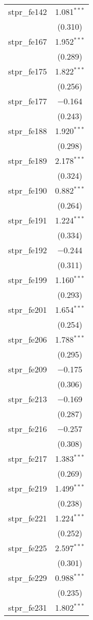 \begin{table}[!htbp]
\begin{tabular}{@{\extracolsep{5pt}}lc}
  stpr\_fe142 & 1.081$^{***}$ \\ 
  & (0.310) \\ 
  stpr\_fe167 & 1.952$^{***}$ \\ 
  & (0.289) \\ 
  stpr\_fe175 & 1.822$^{***}$ \\ 
  & (0.256) \\ 
  stpr\_fe177 & $-$0.164 \\ 
  & (0.243) \\ 
  stpr\_fe188 & 1.920$^{***}$ \\ 
  & (0.298) \\ 
  stpr\_fe189 & 2.178$^{***}$ \\ 
  & (0.324) \\ 
  stpr\_fe190 & 0.882$^{***}$ \\ 
  & (0.264) \\ 
  stpr\_fe191 & 1.224$^{***}$ \\ 
  & (0.334) \\ 
  stpr\_fe192 & $-$0.244 \\ 
  & (0.311) \\ 
  stpr\_fe199 & 1.160$^{***}$ \\ 
  & (0.293) \\ 
  stpr\_fe201 & 1.654$^{***}$ \\ 
  & (0.254) \\ 
  stpr\_fe206 & 1.788$^{***}$ \\ 
  & (0.295) \\ 
  stpr\_fe209 & $-$0.175 \\ 
  & (0.306) \\ 
  stpr\_fe213 & $-$0.169 \\ 
  & (0.287) \\ 
  stpr\_fe216 & $-$0.257 \\ 
  & (0.308) \\ 
  stpr\_fe217 & 1.383$^{***}$ \\ 
  & (0.269) \\ 
  stpr\_fe219 & 1.499$^{***}$ \\ 
  & (0.238) \\ 
  stpr\_fe221 & 1.224$^{***}$ \\ 
  & (0.252) \\ 
  stpr\_fe225 & 2.597$^{***}$ \\ 
  & (0.301) \\ 
  stpr\_fe229 & 0.988$^{***}$ \\ 
  & (0.235) \\ 
  stpr\_fe231 & 1.802$^{***}$ \\ 

\end{tabular}
\end{table}

